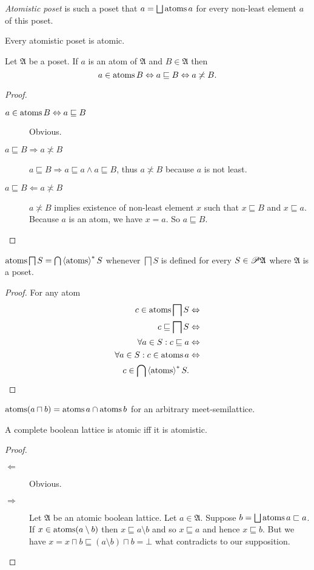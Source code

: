 \begin{defn}
\emph{Atomistic poset} is such a poset that $a=\bigsqcup\operatorname{atoms} a$
for every non-least element $a$ of this poset.\end{defn}
\begin{obvious}
Every atomistic poset is atomic.\end{obvious}
\begin{prop}
Let $\mathfrak{A}$ be a poset. If $a$ is an atom of $\mathfrak{A}$
and $B\in\mathfrak{A}$ then 
\[
a\in\operatorname{atoms} B\Leftrightarrow a\sqsubseteq B\Leftrightarrow a\not\asymp B.
\]
\end{prop}
\begin{proof}
~
\begin{description}
\item [{$a\in\operatorname{atoms} B\Leftrightarrow a\sqsubseteq B$}] Obvious.
\item [{$a\sqsubseteq B\Rightarrow a\nasymp B$}] $a\sqsubseteq B\Rightarrow a\sqsubseteq a\land a\sqsubseteq B$,
thus $a\nasymp B$ because $a$ is not least.
\item [{$a\sqsubseteq B\Leftarrow a\nasymp B$}] $a\nasymp B$ implies
existence of non-least element $x$ such that $x\sqsubseteq B$ and
$x\sqsubseteq a$. Because $a$ is an atom, we have $x=a$. So $a\sqsubseteq B$.
\end{description}
\end{proof}
\begin{thm}
$\operatorname{atoms}\bigsqcap S=\bigcap\left\langle \operatorname{atoms}\right\rangle ^{\ast}S$ whenever $\bigsqcap S$
is defined for every $S\in\mathscr{P}\mathfrak{A}$ where $\mathfrak{A}$
is a poset.\end{thm}
\begin{proof}
For any atom
\begin{align*}
c\in\operatorname{atoms}\bigsqcap S & \Leftrightarrow\\
c\sqsubseteq\bigsqcap S & \Leftrightarrow\\
\forall a\in S:c\sqsubseteq a & \Leftrightarrow\\
\forall a\in S:c\in\operatorname{atoms} a & \Leftrightarrow\\
c\in\bigcap\left\langle \operatorname{atoms}\right\rangle ^{\ast}S.
\end{align*}
\end{proof}
\begin{cor}
\label{atoms-meet}$\operatorname{atoms}(a\sqcap b)=\operatorname{atoms} a\cap\operatorname{atoms} b$ for an
arbitrary meet-semilattice.\end{cor}
\begin{thm}
A complete boolean lattice is atomic iff it is atomistic.\end{thm}
\begin{proof}
~
\begin{description}
\item [{$\Leftarrow$}] Obvious.
\item [{$\Rightarrow$}] Let $\mathfrak{A}$ be an atomic boolean lattice.
Let $a\in\mathfrak{A}$. Suppose $b=\bigsqcup\operatorname{atoms} a\sqsubset a$.
If $x\in\operatorname{atoms}(a\setminus b)$ then $x\sqsubseteq a\setminus b$ and
so $x\sqsubseteq a$ and hence $x\sqsubseteq b$. But we have $x=x\sqcap b\sqsubseteq(a\setminus b)\sqcap b=\bot$
what contradicts to our supposition.
\end{description}
\end{proof}

